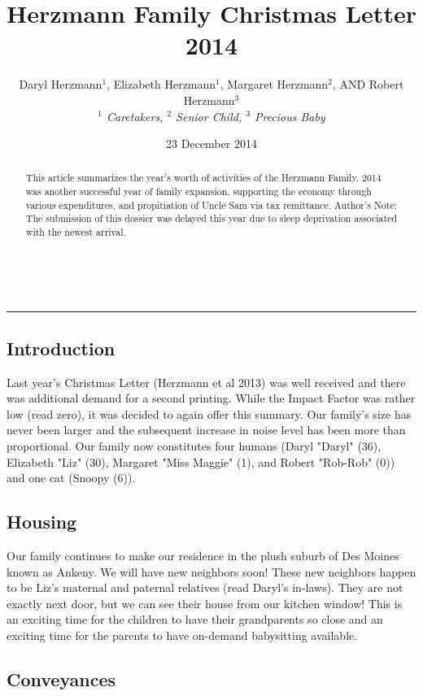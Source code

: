 \documentclass{article}
\title{Herzmann Family Christmas Letter 2014}
\author{Daryl Herzmann${}^1$, Elizabeth Herzmann${}^1$, Margaret 
Herzmann${}^2$, AND Robert Herzmann${}^3$ \\
\it{${}^1$ Caretakers},
\it{${}^2$ Senior Child},
\it{${}^3$ Precious Baby}}
\date{23 December 2014}
\newcommand{\Line}[0]{%
  \rule{0cm}{0cm}\\\hrule\rule{0cm}{0cm}%
}
\begin{document}
\maketitle

\begin{abstract}
This article summarizes the year's worth of activities of the Herzmann
Family.  2014 was another successful year of family expansion, 
supporting the economy through various expenditures, and propitiation of 
Uncle Sam via tax remittance.  Author's Note: The submission of this 
dossier was delayed this year due to sleep deprivation associated with the 
newest arrival.

\end{abstract}

\Line

\begin{multicols}{2}

\section{Introduction} 

Last year's Christmas Letter (Herzmann et al 2013) was well received and 
there was additional demand for a second printing.  While the Impact 
Factor was rather low (read zero), it was decided to again offer this 
summary.  Our family's size has never been larger and the subsequent 
increase in noise level has been more than proportional.  Our family now 
constitutes four humans (Daryl "Daryl" (36), Elizabeth "Liz" (30), 
Margaret "Miss Maggie" (1), and Robert "Rob-Rob" (0)) and one cat (Snoopy 
(6)).

\subsection{Housing}

Our family continues to make our residence in the plush suburb of Des 
Moines known as Ankeny.  We will have new neighbors soon!  These new 
neighbors happen to be Liz's maternal and paternal relatives (read Daryl's 
in-laws).  They are not exactly next door, but we can see their house from 
our kitchen window!  This is an exciting time for the children to have 
their grandparents so close and an exciting time for the parents to have 
on-demand babysitting available.

\subsection{Conveyances}


\end{multicols}
\end{document}
